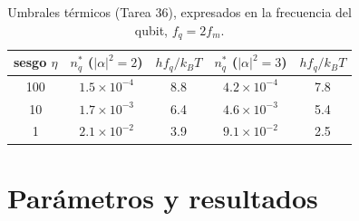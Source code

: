 \documentclass[11pt]{report}
\begin{document}
\begin{table}[h]
\centering
\begin{tabular}{ccccc}
\toprule
sesgo $\eta$ & $n_{q}^{*}$ ($|\alpha|^{2}=2$) & $hf_{q}/k_{B}T$ & $n_{q}^{*}$ ($|\alpha|^{2}=3$) & $hf_{q}/k_{B}T$\\
\midrule
100 & $1.5\times10^{-4}$ & 8.8 & $4.2\times10^{-4}$ & 7.8\\
10 & $1.7\times10^{-3}$ & 6.4 & $4.6\times10^{-3}$ & 5.4\\
1 & $2.1\times10^{-2}$ & 3.9 & $9.1\times10^{-2}$ & 2.5\\
\bottomrule
\end{tabular}
\caption{Umbrales t\'ermicos (Tarea 36), expresados en la frecuencia del qubit, $f_{q}=2f_{m}$.}
\label{tab:termico}
\end{table}

\section{Par\'ametros y resultados}
\end{document}
